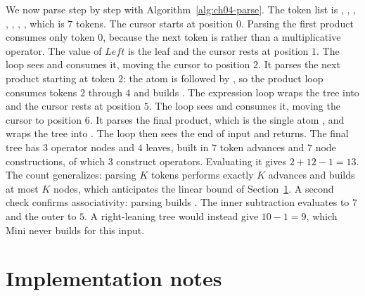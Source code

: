 We now parse  step by step with Algorithm~\ref{alg:ch04-parse}.
The token list is , \code{+}, , \code{*}, , \code{-}, , which is $7$ tokens.
The cursor starts at position $0$.
Parsing the first product consumes only token $0$, because the next token is \code{+} rather than a multiplicative operator.
The value of $Left$ is the leaf  and the cursor rests at position $1$.
The loop sees \code{+} and consumes it, moving the cursor to position $2$.
It parses the next product starting at token $2$: the atom  is followed by \code{*}, so the product loop consumes tokens $2$ through $4$ and builds .
The expression loop wraps the tree into  and the cursor rests at position $5$.
The loop sees \code{-} and consumes it, moving the cursor to position $6$.
It parses the final product, which is the single atom , and wraps the tree into .
The loop then sees the end of input and returns.
The final tree has $3$ operator nodes and $4$ leaves, built in $7$ token advances and $7$ node constructions, of which $3$ construct operators.
Evaluating it gives $2 + 12 - 1 = 13$.
The count generalizes: parsing $K$ tokens performs exactly $K$ advances and builds at most $K$ nodes, which anticipates the linear bound of Section~\ref{sec:ch04-implementation}.
A second check confirms associativity: parsing  builds .
The inner subtraction evaluates to $7$ and the outer to $5$.
A right-leaning tree would instead give $10 - 1 = 9$, which Mini never builds for this input.

\section{Implementation notes}
\label{sec:ch04-implementation}

